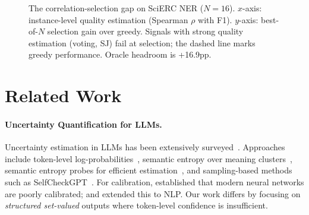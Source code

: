 \documentclass[11pt,a4paper]{article}
\begin{document}
\begin{figure}[t]
\centering
{}
\caption{The correlation-selection gap on SciERC NER ($N{=}16$). $x$-axis: instance-level quality estimation (Spearman $\rho$ with F1). $y$-axis: best-of-$N$ selection gain over greedy. Signals with strong quality estimation (voting, SJ) fail at selection; the dashed line marks greedy performance. Oracle headroom is +16.9pp.}
\label{fig:overview}
\end{figure}

\section{Related Work}
\label{sec:related}

\paragraph{Uncertainty Quantification for LLMs.}
Uncertainty estimation in LLMs has been extensively surveyed~\cite{geng2025uqsurvey,hou2025uqcalibsurvey,xiong2024confestimation,yoshikawa2025abstention}.
Approaches include token-level log-probabilities~\cite{kadavath2022language}, semantic entropy over meaning clusters~\cite{kuhn2023semantic}, semantic entropy probes for efficient estimation~\cite{kossen2024semanticprobes}, and sampling-based methods such as SelfCheckGPT~\cite{manakul2023selfcheckgpt}.
For calibration, \citet{guo2017calibration} established that modern neural networks are poorly calibrated; \citet{desai2020calibration} and \citet{kuleshov2015calibration} extended this to NLP.
Our work differs by focusing on \emph{structured set-valued} outputs where token-level confidence is insufficient.
\end{document}
